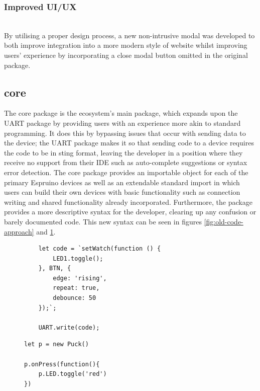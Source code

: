 \documentclass{l4proj}
\begin{document}
\subsubsection{Improved UI/UX}\hfill\\
By utilising a proper design process, a new non-intrusive modal was developed to both improve integration into a more modern style of website whilst improving users' experience by incorporating a close modal button omitted in the original package.

\subsection{core}

The core package is the ecosystem's main package, which expands upon the UART package by providing users with an experience more akin to standard programming. It does this by bypassing issues that occur with sending data to the device; the UART package makes it so that sending code to a device requires the code to be in sting format, leaving the developer in a position where they receive no support from their IDE such as auto-complete suggestions or syntax error detection. The core package provides an importable object for each of the primary Espruino devices as well as an extendable standard import in which users can build their own devices with basic functionality such as connection writing and shared functionality already incorporated. Furthermore, the package provides a more descriptive syntax for the developer, clearing up any confusion or barely documented code. This new syntax can be seen in figures \ref{fig:old-code-approach} and \ref{fig:new-code-approach}.

\begin{figure}[!ht]
\centering
\begin{minipage}{6cm}
  \centering
  \begin{lstlisting}
    let code = `setWatch(function () {
        LED1.toggle();
    }, BTN, {
        edge: 'rising',
        repeat: true,
        debounce: 50
    });`;

    UART.write(code);
  \end{lstlisting}
  
  \label{fig:old-code-approach}
\end{minipage}
\hspace{1cm}
\begin{minipage}{6cm}
  \centering
  
  \begin{lstlisting}
let p = new Puck()

p.onPress(function(){
    p.LED.toggle('red')
})
  \end{lstlisting}
  \label{fig:new-code-approach}
\end{minipage}
\end{figure}
\end{document}
